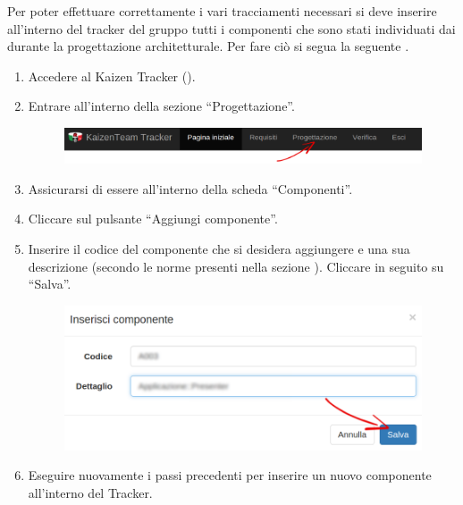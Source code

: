 					 \label{sec:InsComponente}
					Per poter effettuare correttamente i vari tracciamenti necessari si deve inserire all'interno del tracker del gruppo tutti i componenti che sono stati individuati dai  durante la progettazione architetturale. Per fare ciò si segua la seguente .
					\begin{enumerate}
						\item Accedere al Kaizen  Tracker ().
						\item Entrare all'interno della sezione “Progettazione”.
						\begin{figure}[H]
							\centering
							\includegraphics[width=\textwidth]{Pics/HomePageMenuFrecciaProg}
						\end{figure}
						\item Assicurarsi di essere all'interno della scheda “Componenti”.
						\item Cliccare sul pulsante “Aggiungi componente”.
						\item Inserire il codice del componente che si desidera aggiungere e una sua descrizione (secondo le norme presenti nella sezione ). Cliccare in seguito su “Salva”.
						\begin{figure}[H]
							\centering
							\includegraphics[width=\textwidth]{Pics/InserireComponente}
						\end{figure}
						\item Eseguire nuovamente i passi precedenti per inserire un nuovo componente all'interno del Tracker.
					\end{enumerate}

